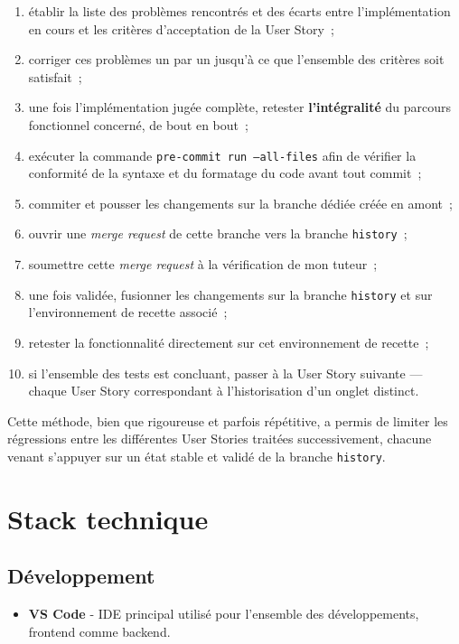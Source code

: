\begin{enumerate}
  \item établir la liste des problèmes rencontrés et des écarts entre
        l'implémentation en cours et les critères d'acceptation de la
        User Story~;
  \item corriger ces problèmes un par un jusqu'à ce que l'ensemble des
        critères soit satisfait~;
  \item une fois l'implémentation jugée complète, retester
        \textbf{l'intégralité} du parcours fonctionnel concerné, de bout
        en bout~;
  \item exécuter la commande \texttt{pre-commit run --all-files} afin de
        vérifier la conformité de la syntaxe et du formatage du code
        avant tout commit~;
  \item commiter et pousser les changements sur la branche dédiée créée
        en amont~;
  \item ouvrir une \textit{merge request} de cette branche vers la
        branche \texttt{history}~;
  \item soumettre cette \textit{merge request} à la vérification de mon
        tuteur~;
  \item une fois validée, fusionner les changements sur la branche
        \texttt{history} et sur l'environnement de recette associé~;
  \item retester la fonctionnalité directement sur cet environnement de
        recette~;
  \item si l'ensemble des tests est concluant, passer à la User Story
        suivante — chaque User Story correspondant à l'historisation d'un
        onglet distinct.
\end{enumerate}

Cette méthode, bien que rigoureuse et parfois répétitive, a permis de
limiter les régressions entre les différentes User Stories traitées
successivement, chacune venant s'appuyer sur un état stable et validé de
la branche \texttt{history}.

\section{Stack technique}

\subsection{Développement}
\begin{itemize}
  \item \textbf{VS Code}   -  IDE principal
        utilisé pour l'ensemble des développements, frontend comme backend.
\end{itemize}

